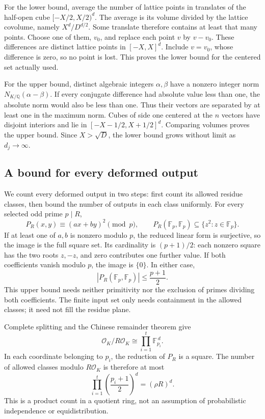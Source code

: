For the lower bound, average the number of lattice points in translates of the half-open cube $[-X/2,X/2)^d$. The average is its volume divided by the lattice covolume, namely $X^d/D^{d/2}$. Some translate therefore contains at least that many points. Choose one of them, $v_0$, and replace each point $v$ by $v-v_0$. These differences are distinct lattice points in $[-X,X]^d$. Include $v=v_0$, whose difference is zero, so no point is lost. This proves the lower bound for the centered set actually used.

For the upper bound, distinct algebraic integers $\alpha,\beta$ have a nonzero integer norm $N_{K/\mathbb Q}(\alpha-\beta)$. If every conjugate difference had absolute value less than one, the absolute norm would also be less than one. Thus their vectors are separated by at least one in the maximum norm. Cubes of side one centered at the $n$ vectors have disjoint interiors and lie in $[-X-1/2,X+1/2]^d$. Comparing volumes proves the upper bound. Since $X>\sqrt D$, the lower bound grows without limit as $d_j\to\infty$.

\subsection{A bound for every deformed output}
\label{subsec:quadratic-outputs}

We count every deformed output in two steps: first count its allowed residue classes, then bound the number of outputs in each class uniformly. For every selected odd prime $p\mid R$,
\[
P_R(x,y)\equiv(ax+by)^2\pmod p,
\qquad
P_R(\mathbb F_p,\mathbb F_p)\subseteq\{z^2:z\in\mathbb F_p\}.
\]
If at least one of $a,b$ is nonzero modulo $p$, the reduced linear form is surjective, so the image is the full square set. Its cardinality is $(p+1)/2$: each nonzero square has the two roots $z,-z$, and zero contributes one further value. If both coefficients vanish modulo $p$, the image is $\{0\}$. In either case,
\[
|P_R(\mathbb F_p,\mathbb F_p)|\le\frac{p+1}{2}.
\]
This upper bound needs neither primitivity nor the exclusion of primes dividing both coefficients. The finite input set only needs containment in the allowed classes; it need not fill the residue plane.

Complete splitting and the Chinese remainder theorem give
\[
\mathcal O_K/R\mathcal O_K
\cong\prod_{i=1}^t\mathbb F_{p_i}^{\,d}.
\]
In each coordinate belonging to $p_i$, the reduction of $P_R$ is a square. The number of allowed classes modulo $R\mathcal O_K$ is therefore at most
\begin{equation}
\prod_{i=1}^t\left(\frac{p_i+1}{2}\right)^d
=(\rho R)^d.
\label{eq:quadratic-residue-count}
\end{equation}
This is a product count in a quotient ring, not an assumption of probabilistic independence or equidistribution.

